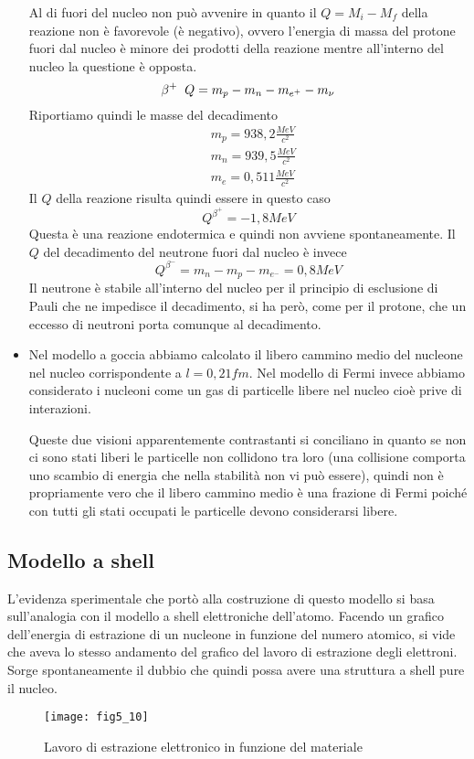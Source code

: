 \begin{itemize}
Al di fuori del nucleo non può avvenire in quanto il $Q=M_i-M_f$ della reazione non è favorevole (è negativo), ovvero l'energia di massa del protone fuori dal nucleo è minore dei prodotti della reazione mentre all'interno del nucleo la questione è opposta.
\begin{equation}
\beta^+\hspace{0.2cm}Q=m_p-m_n-m_{e^+}-m_\nu
\end{equation}
Riportiamo quindi le masse del decadimento 
\begin{equation}
\begin{split}
&m_p=938,2\frac{MeV}{c^2}\\
&m_n=939,5\frac{MeV}{c^2}\\
&m_e=0,511\frac{MeV}{c^2}
\end{split}
\end{equation}
Il $Q$ della reazione risulta quindi essere in questo caso
\begin{equation}
Q^{\beta^+}=-1,8MeV
\end{equation}
Questa è una reazione endotermica e quindi non avviene spontaneamente.
Il $Q$ del decadimento del neutrone fuori dal nucleo è invece
\begin{equation}
Q^{\beta^-}=m_n-m_p-m_{e^-}=0,8MeV
\end{equation}
Il neutrone è stabile all'interno del nucleo per il principio di esclusione di Pauli che ne impedisce il decadimento, si ha però, come per il protone, che un eccesso di neutroni porta comunque al decadimento.

\item Nel modello a goccia abbiamo calcolato il libero cammino medio del nucleone nel nucleo corrispondente a $l=0,21fm$.
Nel modello di Fermi invece abbiamo considerato i nucleoni come un gas di particelle libere nel nucleo cioè prive di interazioni.

Queste due visioni apparentemente contrastanti si conciliano in quanto se non ci sono stati liberi le particelle non collidono tra loro (una collisione comporta uno scambio di energia che nella stabilità non vi può essere), quindi non è propriamente vero che il libero cammino medio è una frazione di Fermi poiché  con tutti gli stati occupati le particelle devono considerarsi libere.
\end{itemize}

\subsection{Modello a shell}
L'evidenza sperimentale che portò alla costruzione di questo modello si basa sull'analogia con il modello a shell elettroniche dell'atomo. 
Facendo un grafico dell'energia di estrazione di un nucleone in funzione del numero atomico, si vide che aveva lo stesso andamento del grafico del lavoro di estrazione degli elettroni.
Sorge spontaneamente il dubbio che quindi possa avere una struttura a shell pure il nucleo.
\begin{figure}[h]
\centering
\texttt{[image: fig5\_10]}
\caption{Lavoro di estrazione elettronico in funzione del materiale}
\end{figure}

